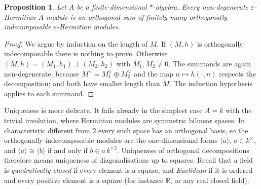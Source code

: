 \documentclass[12pt, a4paper]{report}
\theoremstyle{plain}
\newtheorem{proposition}[theorem]{Proposition}
\theoremstyle{definition}
\theoremstyle{remark}
\theoremstyle{plain}
\newcommand{\RR}{\mathbb{R}}
\begin{document}
\begin{proposition}\label{prop:orth-existence}
Let $A$ be a finite-dimensional $*$-algebra. Every non-degenerate $\varepsilon$-Hermitian $A$-module is an orthogonal sum of finitely many orthogonally indecomposable $\varepsilon$-Hermitian modules.
\end{proposition}
\begin{proof}
We argue by induction on the length of $M$. If $(M,h)$ is orthogonally indecomposable there is nothing to prove. Otherwise $(M,h)=(M_1,h_1)\perp(M_2,h_2)$ with $M_1,M_2\neq 0$. The summands are again non-degenerate, because $M^\vee=M_1^\vee\oplus M_2^\vee$ and the map $n\mapsto h(\cdot,n)$ respects the decomposition; and both have smaller length than $M$. The induction hypothesis applies to each summand.
\end{proof}

Uniqueness is more delicate. It fails already in the simplest case $A=k$ with the trivial involution, where Hermitian modules are symmetric bilinear spaces. In characteristic different from $2$ every such space has an orthogonal basis, so the orthogonally indecomposable modules are the one-dimensional forms $\langle a\rangle$, $a\in k^\times$, and $\langle a\rangle\cong\langle b\rangle$ if and only if $b\in a\,k^{\times 2}$. Uniqueness of orthogonal decompositions therefore means uniqueness of diagonalisations up to squares. Recall that a field is \emph{quadratically closed} if every element is a square, and \emph{Euclidean} if it is ordered and every positive element is a square (for instance $\RR$, or any real closed field).
\end{document}
